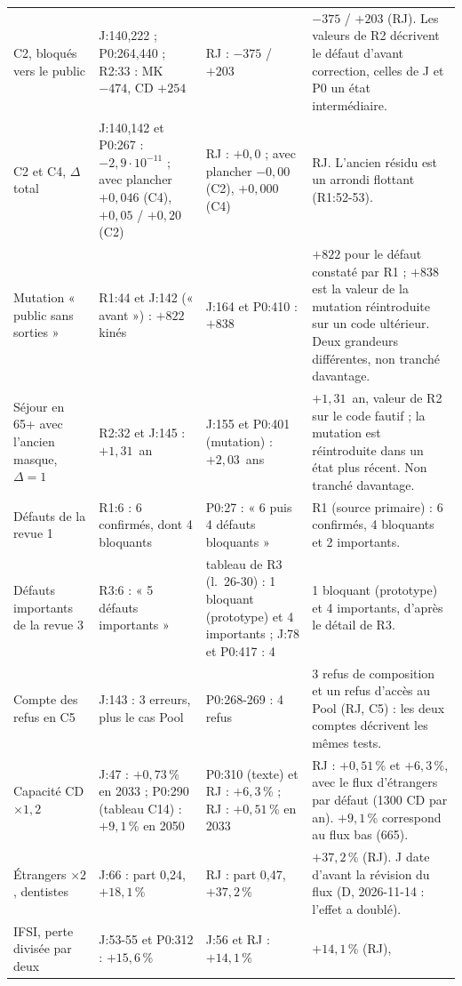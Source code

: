 {\begin{longtable}{@{}p{2.9cm}p{3.5cm}p{3.5cm}p{4.7cm}@{}}
C2, bloqués vers le public & J:140,222 ; P0:264,440 ; R2:33 : MK $-474$, CD $+254$ & RJ : $-375$ / $+203$ & $-375$ /
  $+203$ (RJ). Les valeurs de R2 décrivent le défaut d'avant correction, celles de J et P0 un état intermédiaire. \\
C2 et C4, $\Delta$ total & J:140,142 et P0:267 : $-2{,}9\cdot10^{-11}$ ; avec plancher $+0{,}046$ (C4), $+0{,}05$ /
  $+0{,}20$ (C2) & RJ : $+0{,}0$ ; avec plancher $-0{,}00$ (C2), $+0{,}000$ (C4) & RJ. L'ancien résidu est un
  arrondi flottant (R1:52-53). \\
Mutation « public sans sorties » & R1:44 et J:142 (« avant ») : $+822$ kinés & J:164 et P0:410 : $+838$ & $+822$
  pour le défaut constaté par R1 ; $+838$ est la valeur de la mutation réintroduite sur un code ultérieur. Deux
  grandeurs différentes, non tranché davantage. \\
Séjour en 65+ avec l'ancien masque, $\Delta = 1$ & R2:32 et J:145 : $+1{,}31$~an & J:155 et P0:401 (mutation) :
  $+2{,}03$~ans & $+1{,}31$~an, valeur de R2 sur le code fautif ; la mutation est réintroduite dans un état plus
  récent. Non tranché davantage. \\
Défauts de la revue 1 & R1:6 : 6 confirmés, dont 4 bloquants & P0:27 : « 6 puis 4 défauts bloquants » & R1 (source
  primaire) : 6 confirmés, 4 bloquants et 2 importants. \\
Défauts importants de la revue 3 & R3:6 : « 5 défauts importants » & tableau de R3 (l.~26-30) : 1 bloquant
  (prototype) et 4 importants ; J:78 et P0:417 : 4 & 1 bloquant (prototype) et 4 importants, d'après le détail de
  R3. \\
Compte des refus en C5 & J:143 : 3 erreurs, plus le cas Pool & P0:268-269 : 4 refus & 3 refus de composition et
  un refus d'accès au Pool (RJ, C5) : les deux comptes décrivent les mêmes tests. \\
Capacité CD $\times 1{,}2$ & J:47 : $+0{,}73$\,\% en 2033 ; P0:290 (tableau C14) : $+9{,}1$\,\% en 2050 & P0:310
  (texte) et RJ : $+6{,}3$\,\% ; RJ : $+0{,}51$\,\% en 2033 & RJ : $+0{,}51$\,\% et $+6{,}3$\,\%, avec le flux
  d'étrangers par défaut (\num{1300} CD par an). $+9{,}1$\,\% correspond au flux bas (665). \\
Étrangers $\times 2$, dentistes & J:66 : part 0,24, $+18{,}1$\,\% & RJ : part 0,47, $+37{,}2$\,\% & $+37{,}2$\,\%
  (RJ). J date d'avant la révision du flux (D, 2026-11-14 : l'effet a doublé). \\
IFSI, perte divisée par deux & J:53-55 et P0:312 : $+15{,}6$\,\% & J:56 et RJ : $+14{,}1$\,\% & $+14{,}1$\,\% (RJ),

\end{longtable}}
